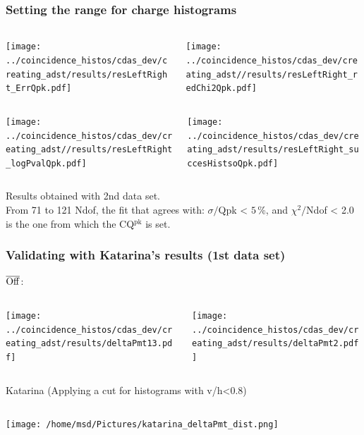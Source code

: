 \documentclass[aspectratio=169]{beamer}
\def\Offline{\mbox{$\overline{\rm Off}$\hspace{.05em}\raisebox{.4ex}{$\underline{\rm line}$}}\xspace}
\begin{document}
\begin{frame}
  \frametitle{Setting the range for charge histograms}

  \begin{columns}
    \centering
    \begin{column}{0.5\textwidth}
      \texttt{[image: ../coincidence\_histos/cdas\_dev/creating\_adst/results/resLeftRight\_ErrQpk.pdf]}
    \end{column}
    \begin{column}{0.5\textwidth}
      \texttt{[image: ../coincidence\_histos/cdas\_dev/creating\_adst//results/resLeftRight\_redChi2Qpk.pdf]}
    \end{column}
  \end{columns}

  \begin{columns}
    \centering
    \begin{column}{0.5\textwidth}
      \texttt{[image: ../coincidence\_histos/cdas\_dev/creating\_adst//results/resLeftRight\_logPvalQpk.pdf]}
    \end{column}
    \begin{column}{0.5\textwidth}
      \texttt{[image: ../coincidence\_histos/cdas\_dev/creating\_adst/results/resLeftRight\_succesHistsoQpk.pdf]}
    \end{column}
  \end{columns}
  \vspace{0.1cm}

  Results obtained with 2nd data set.\\
  From 71 to 121 Ndof, the fit that agrees with: $\sigma/$Qpk
  < $5$\,\%, and $\chi^2/$Ndof < 2.0 is the one from which
  the CQ$^{\mathrm{pk}}$ is set.
\end{frame}

\begin{frame}
  \frametitle{Validating with Katarina's results (1st data set)}

  \Offline:
  \begin{columns}
    \centering
    \begin{column}{0.5\textwidth}
      \texttt{[image: ../coincidence\_histos/cdas\_dev/creating\_adst/results/deltaPmt13.pdf]}
    \end{column}
    \begin{column}{0.5\textwidth}
      \texttt{[image: ../coincidence\_histos/cdas\_dev/creating\_adst/results/deltaPmt2.pdf]}
    \end{column}
  \end{columns}

  Katarina (Applying a cut for histograms with v/h<0.8)
  \begin{columns}
    \centering
    \begin{column}{0.5\textwidth}
      \texttt{[image: /home/msd/Pictures/katarina\_deltaPmt\_dist.png]}
    \end{column}
  \end{columns}
\end{frame}
\end{document}
